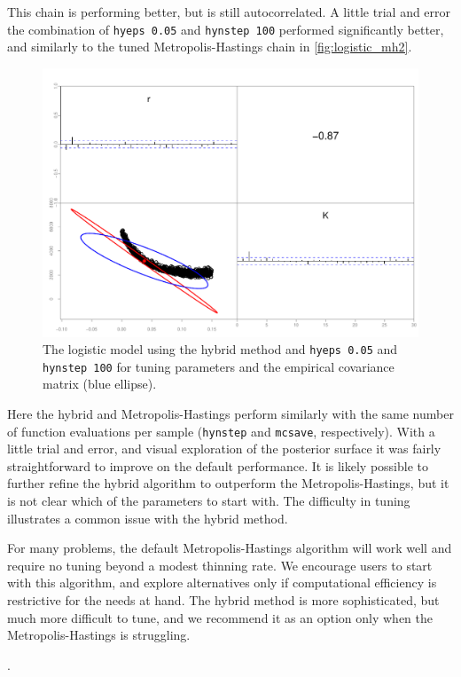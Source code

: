 \documentclass{article}\usepackage[]{graphicx}\usepackage[]{color}
\begin{document}
This chain is performing better, but is still
autocorrelated. A little trial and error the combination of
\texttt{hyeps 0.05} and \texttt{hynstep 100} performed
significantly better, and similarly to the tuned Metropolis-Hastings chain in
\ref{fig:logistic_mh2}.
\begin{figure}[H]
  \centering
  \includegraphics[width=5in]{../plots/logistic_hy3.pdf}
  \caption{The logistic model using the hybrid method and
    \texttt{hyeps 0.05} and \texttt{hynstep 100} for tuning
    parameters and the empirical covariance matrix (blue
    ellipse).}
  \label{fig:logistic_hy3}
\end{figure}

Here the hybrid and Metropolis-Hastings perform similarly with the same
number of function evaluations per sample (\texttt{hynstep}
and \texttt{mcsave}, respectively). With a little trial and
error, and visual exploration of the posterior surface it
was fairly straightforward to improve on the default
performance. It is likely possible to further refine the
hybrid algorithm to outperform the Metropolis-Hastings, but it is not clear
which of the parameters to start with. The difficulty in
tuning illustrates a common issue with the hybrid method.

For many problems, the default Metropolis-Hastings algorithm will work well
and require no tuning beyond a modest thinning rate. We
encourage users to start with this algorithm, and explore
alternatives only if computational efficiency is restrictive
for the needs at hand. The hybrid method is more
sophisticated, but much more difficult to tune, and we
recommend it as an option only when the Metropolis-Hastings is struggling.

\newpage

.
\end{document}
